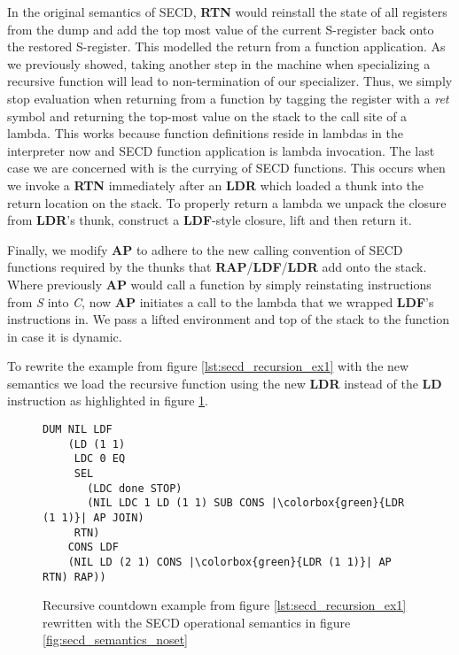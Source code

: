 \documentclass[a4paper,12pt,twoside,openright]{report}
\theoremstyle{definition}
\newcommand{\ts}{\textquotesingle}
\begin{document}
In the original semantics of SECD, \textbf{RTN} would reinstall the state of all registers from the dump and add the top most value of the current S-register back onto the restored S-register. This modelled the return from a function application. As we previously showed, taking another step in the machine when specializing a recursive function will lead to non-termination of our specializer. Thus, we simply stop evaluation when returning from a function by tagging the register with a \textit{{\ts}ret} symbol and returning the top-most value on the stack to the call site of a lambda. This works because function definitions reside in lambdas in the interpreter now and SECD function application is lambda invocation. The last case we are concerned with is the currying of SECD functions. This occurs when we invoke a \textbf{RTN} immediately after an \textbf{LDR} which loaded a thunk into the return location on the stack. To properly return a lambda we unpack the closure from \textbf{LDR}'s thunk, construct a \textbf{LDF}-style closure, lift and then return it.

Finally, we modify \textbf{AP} to adhere to the new calling convention of SECD functions required by the thunks that \textbf{RAP}/\textbf{LDF}/\textbf{LDR} add onto the stack. Where previously \textbf{AP} would call a function by simply reinstating instructions from \textit{S} into \textit{C}, now \textbf{AP} initiates a call to the lambda that we wrapped \textbf{LDF}'s instructions in. We pass a lifted environment and top of the stack to the function in case it is dynamic.

To rewrite the example from figure \ref{lst:secd_recursion_ex1} with the new semantics we load the recursive function using the new \textbf{LDR} instead of the \textbf{LD} instruction as highlighted in figure \ref{lst:secd_recursion_ex1_newsem}.

\begin{figure}[ht]
\begin{verbatim}
DUM NIL LDF
    (LD (1 1)
     LDC 0 EQ
     SEL
       (LDC done STOP)
       (NIL LDC 1 LD (1 1) SUB CONS |\colorbox{green}{LDR (1 1)}| AP JOIN)
     RTN)
    CONS LDF
    (NIL LD (2 1) CONS |\colorbox{green}{LDR (1 1)}| AP RTN) RAP))
\end{verbatim}
\caption{Recursive countdown example from figure \ref{lst:secd_recursion_ex1} rewritten with the SECD operational semantics in figure \ref{fig:secd_semantics_noset}}
\label{lst:secd_recursion_ex1_newsem}
\end{figure}
\end{document}
